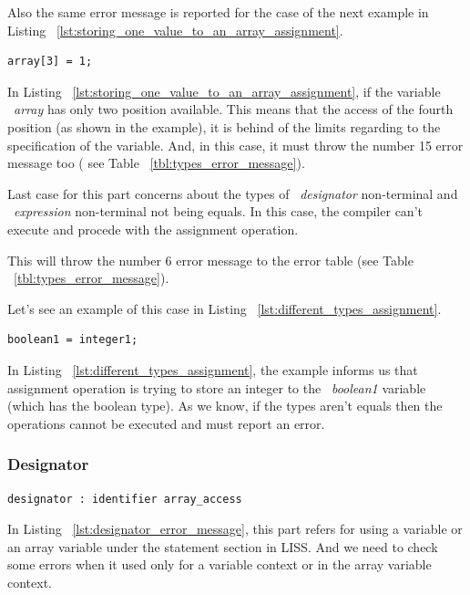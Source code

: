 \documentclass[
  oneside,
  11pt, a4paper,
  footinclude=true,
  headinclude=true,
  cleardoublepage=empty
]{scrbook}
\begin{document}
Also the same error message is reported for the case of the next example in Listing ~\ref{lst:storing_one_value_to_an_array_assignment}.

\begin{lstlisting}[caption={Example of storing a value to a certain position in the array},label={lst:storing_one_value_to_an_array_assignment}]
  array[3] = 1;
\end{lstlisting}

In Listing ~\ref{lst:storing_one_value_to_an_array_assignment}, if the variable ~\textit{array} has only two position available. This means that the access of the fourth position (as shown in the example), it is behind of the limits regarding to the specification of the variable.
And, in this case, it must throw the number 15 error message too ( see Table ~\ref{tbl:types_error_message}).

Last case for this part concerns about the types of ~\textit{designator} non-terminal and ~\textit{expression} non-terminal not being equals. In this case, the compiler can't execute and procede with the assignment operation.

This will throw the number 6 error message to the error table (see Table ~\ref{tbl:types_error_message}).

Let's see an example of this case in Listing ~\ref{lst:different_types_assignment}.

\begin{lstlisting}[caption={Example of assignment with differents types},label={lst:different_types_assignment}]
  boolean1 = integer1;
\end{lstlisting}

In Listing ~\ref{lst:different_types_assignment}, the example informs us that assignment operation is trying to store an integer to the ~\textit{boolean1} variable (which has the boolean type).
As we know, if the types aren't equals then the operations cannot be executed and must report an error.

\subsubsection{Designator}

\begin{lstlisting}[caption={Designator rule in LISS},label={lst:designator_error_message}]
  designator : identifier array_access
\end{lstlisting}

In Listing ~\ref{lst:designator_error_message}, this part refers for using a variable or an array variable under the statement section in LISS.
And we need to check some errors when it used only for a variable context or in the array variable context.
\end{document}
